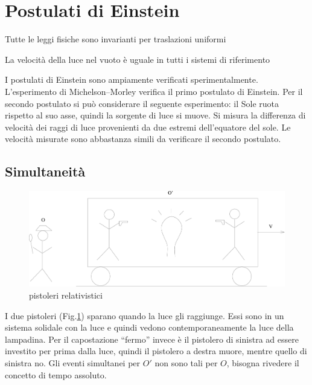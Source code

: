 \section{Postulati di Einstein}
\begin{post}
Tutte le leggi fisiche sono invarianti per traslazioni uniformi
\end{post}
\begin{post}
La velocità della luce nel vuoto è uguale in tutti i sistemi di riferimento
\end{post}

I postulati di Einstein sono ampiamente verificati sperimentalmente. L'esperimento di Michelson--Morley verifica il primo postulato di Einstein. Per il secondo postulato si può considerare il seguente esperimento: il Sole ruota rispetto al suo asse, quindi la sorgente di luce si muove. Si misura la differenza di velocità dei raggi di luce provenienti da due estremi dell'equatore del sole. Le velocità misurate sono abbastanza simili da verificare il secondo postulato.

\subsection{Simultaneità}

\begin{figure}[htbp]
   \centering
   \includegraphics[scale=0.2]{immagini/fisica1/pistoleri}
   \caption{pistoleri relativistici}
   \label{pistoleri}
\end{figure}


I due pistoleri (Fig.\@ \ref{pistoleri}) sparano quando la luce gli raggiunge. Essi sono in un sistema solidale con la luce e quindi vedono contemporaneamente la luce della lampadina. Per il capostazione ``fermo'' invece è il pistolero di sinistra ad essere investito per prima dalla luce, quindi il pistolero a destra muore, mentre quello di sinistra no. Gli eventi simultanei per $O'$ non sono tali per $O$, bisogna rivedere il concetto di tempo assoluto.

